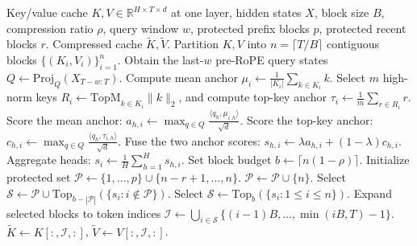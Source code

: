 \documentclass[sigplan,10pt,review,anonymous]{acmart}
\begin{document}
\begin{algorithm}[t]
\caption{\textsc{KVCore}: Low-Cost Query-Guided Block Compression}
\label{alg:blockwise-press}
\small
\begin{algorithmic}[1]
\Require Key/value cache $K,V \in \mathbb{R}^{H \times T \times d}$ at one layer,
hidden states $X$, block size $B$, compression ratio $\rho$,
query window $w$, protected prefix blocks $p$, protected recent blocks $r$.
\Ensure Compressed cache $\widetilde{K},\widetilde{V}$.
\State Partition $K,V$ into $n=\lceil T/B\rceil$ contiguous blocks
       $\{(K_i,V_i)\}_{i=1}^{n}$.
\State Obtain the last-$w$ pre-RoPE query states
       $Q \leftarrow \mathrm{Proj}_{Q}(X_{T-w:T})$.
    \State Compute mean anchor
       $\mu_i \leftarrow \frac{1}{|K_i|}\sum_{k \in K_i} k$.
    \State Select $m$ high-norm keys
       $R_i \leftarrow \mathrm{TopM}_{k\in K_i} \|k\|_2$,
       and compute top-key anchor $\tau_i \leftarrow \frac{1}{m}\sum_{r \in R_i} r$.
    \State Score the mean anchor:
       $a_{h,i} \leftarrow
       \max_{q \in Q}
       \frac{\langle q_h,\mu_{i,h}\rangle}{\sqrt{d}}$.
    \State Score the top-key anchor:
       $c_{h,i} \leftarrow
       \max_{q \in Q}
       \frac{\langle q_h,\tau_{i,h}\rangle}{\sqrt{d}}$.
    \State Fuse the two anchor scores:
       $s_{h,i} \leftarrow \lambda a_{h,i} + (1-\lambda)c_{h,i}$.
    \State Aggregate heads:
       $s_i \leftarrow \frac{1}{H}\sum_{h=1}^{H}s_{h,i}$.
\EndFor
\State Set block budget $b \leftarrow \lceil n(1-\rho)\rceil$.
\State Initialize protected set
       $\mathcal{P} \leftarrow \{1,\ldots,p\}
       \cup \{n-r+1,\ldots,n\}$.
    \State $\mathcal{P} \leftarrow \mathcal{P}\cup\{n\}$.
\EndIf
{}
    \State Select $\mathcal{S} \leftarrow \mathcal{P}
    \cup \mathrm{Top}_{b-|\mathcal{P}|}
    \left(\{s_i: i \notin \mathcal{P}\}\right)$.
\Else
    \State Select $\mathcal{S} \leftarrow
    \mathrm{Top}_{b}\left(\{s_i: 1\le i\le n\}\right)$.
\EndIf
\State Expand selected blocks to token indices
       $\mathcal{I}\leftarrow \bigcup_{i\in\mathcal{S}}\{(i-1)B,\ldots,\min(iB,T)-1\}$.
\State \Return $\widetilde{K}\leftarrow K[:,\mathcal{I},:]$,
       $\widetilde{V}\leftarrow V[:,\mathcal{I},:]$.
\end{algorithmic}
\end{algorithm}
\end{document}
